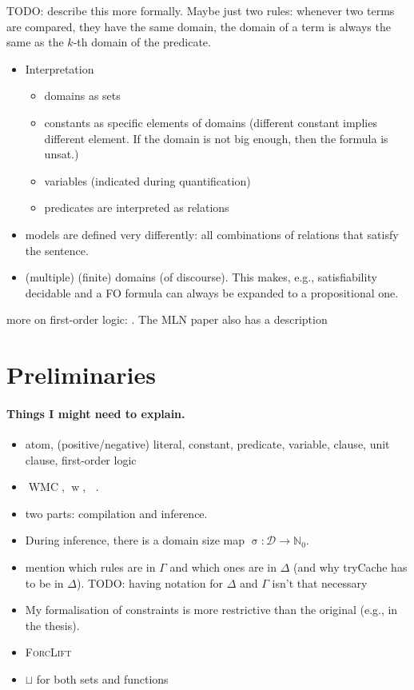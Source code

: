 \documentclass{article}
\theoremstyle{definition}
\theoremstyle{remark}
\DeclareMathOperator{\wwp}{w}
\DeclareMathOperator{\wwn}{\overline{w}}
\DeclareMathOperator{\size}{\sigma}
\DeclareMathOperator{\WMC}{WMC}
\begin{document}
TODO: describe this more formally. Maybe just two rules: whenever two terms are compared, they have the same domain, the domain of a term is always the same as the $k$-th domain of the predicate.

\begin{itemize}
\item Interpretation
  \begin{itemize}
  \item domains as sets
  \item constants as specific elements of domains (different constant implies different element. If the domain is not big enough, then the formula is unsat.)
  \item variables (indicated during quantification)
  \item predicates are interpreted as relations
  \end{itemize}
\item models are defined very differently: all combinations of relations that satisfy the sentence.
\item (multiple) (finite) domains (of discourse). This makes, e.g., satisfiability decidable and a FO formula can always be expanded to a propositional one.
\end{itemize}

more on first-order logic: \citep{DBLP:books/daglib/0023546}. The MLN paper also has a description

\section{Preliminaries}

\paragraph{Things I might need to explain.}
\begin{itemize}
\item atom, (positive/negative) literal, constant, predicate, variable, clause, unit clause, first-order logic
\item $\WMC$, $\wwp$, $\wwn$.
\item two parts: compilation and inference.
\item During inference, there is a domain size map $\size\colon \mathcal{D} \to \mathbb{N}_0$.
\item mention which rules are in $\Gamma$ and which ones are in $\Delta$ (and why tryCache has to be in $\Delta$). TODO: having notation for $\Delta$ and $\Gamma$ isn't that necessary
\item My formalisation of constraints is more restrictive than the original (e.g., in the thesis).
\item \textsc{ForcLift}
\item $\sqcup$ for both sets and functions
\end{itemize}
\end{document}
